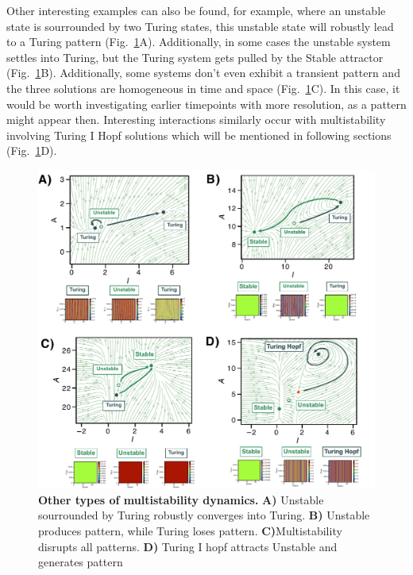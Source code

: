 Other interesting examples can also be found, for example, where an unstable state is sourrounded by two Turing states, this unstable state will robustly lead to a Turing pattern (Fig.~\ref{fig:multistability_leftover}A).
Additionally, in some cases the unstable system settles into Turing, but the Turing system gets pulled by the Stable attractor (Fig.~\ref{fig:multistability_leftover}B). Additionally, some systems don't even exhibit a transient pattern and the three solutions are homogeneous in time and space (Fig.~\ref{fig:multistability_leftover}C).
In this case, it would be worth investigating earlier timepoints with more resolution, as a pattern might appear then.
Interesting interactions similarly occur with multistability involving Turing I Hopf solutions which will be mentioned in following sections (Fig.~\ref{fig:multistability_leftover}D).


\begin{figure}[H] %
    \centering
    \begin{adjustbox}{center}
    \includegraphics[width=1.2\textwidth]{chapters/Chapter 1/multistability_leftover} %
    \end{adjustbox}
    \caption{\textbf{Other types of multistability dynamics.} \textbf{A)} Unstable sourrounded by Turing robustly converges into Turing. \textbf{B)} Unstable produces pattern, while Turing loses pattern. \textbf{C)}Multistability disrupts all patterns. \textbf{D)} Turing I hopf attracts Unstable and generates pattern}
    \label{fig:multistability_leftover} %
\end{figure}

